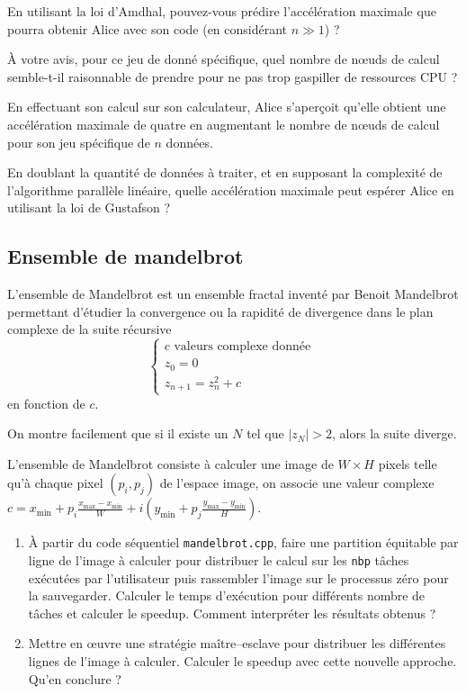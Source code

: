 \documentclass[11pt,a4paper]{article}
\begin{document}
En utilisant la loi d'Amdhal, pouvez-vous prédire l'accélération maximale que pourra obtenir Alice
avec son code (en considérant $n\gg 1$) ? 

À votre avis, pour ce jeu de donné spécifique, quel nombre de n{\oe}uds de calcul semble-t-il
raisonnable de prendre pour ne pas trop gaspiller de ressources CPU ?

En effectuant son calcul sur son calculateur, Alice s'aperçoit qu'elle obtient une accélération
maximale de quatre en augmentant le nombre de n{\oe}uds de calcul pour son jeu spécifique de $n$ données.

En doublant la quantité de données à traiter, et en supposant la complexité de l'algorithme parallèle
linéaire, quelle accélération maximale peut espérer Alice en utilisant la loi de Gustafson ?

\subsection{Ensemble de mandelbrot}

L'ensemble de Mandelbrot est un ensemble fractal inventé par Benoit Mandelbrot permettant d'étudier  la convergence ou la rapidité de divergence dans le plan complexe de la suite récursive 
$$
\left\{\begin{array}{l}
c \mbox{ valeurs complexe donnée } \\
z_{0} = 0\\
z_{n+1} = z_{n}^{2} + c
\end{array}\right.
$$
en fonction de $c$.

On montre facilement que si il existe un $N$ tel que $|z_{N}| > 2$, alors la suite diverge. 

L'ensemble de Mandelbrot consiste à calculer une image de $W \times H$ pixels telle qu'à chaque pixel $\left(p_{i},p_{j}\right)$ de l'espace image, on associe une valeur complexe
$c = x_{\min}+p_{i} \frac{x_{\max}-x_{\min}}{W} +  i \left (y_{\min}+p_{j} \frac{y_{\max}-y_{\min}}{H}\right)$.

\begin{enumerate}
\item À partir du code séquentiel \texttt{mandelbrot.cpp}, faire une partition équitable par ligne de l'image à calculer pour distribuer le calcul sur les \texttt{nbp} tâches exécutées par l'utilisateur puis rassembler l'image sur le processus zéro pour la sauvegarder. Calculer le temps d'exécution pour différents nombre de tâches et calculer le speedup. Comment interpréter les résultats obtenus ?
\item Mettre en {\oe}uvre une stratégie maître--esclave pour distribuer les différentes lignes de l'image à calculer. Calculer le speedup avec cette nouvelle approche. Qu'en conclure ?
\end{enumerate}
\end{document}
